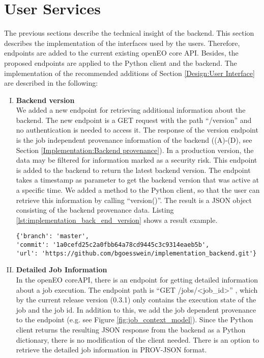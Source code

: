 \documentclass[draft,final]{vutinfth} %
\begin{document}
\section{User Services}\label{Implementation:User Interface}
The previous sections describe the technical insight of the backend. This section describes the implementation of the interfaces used by the users. Therefore, endpoints are added to the current existing openEO core API. Besides, the proposed endpoints are applied to the Python client and the backend. The implementation of the recommended additions of Section \ref{Design:User Interface} are described in the following:

\begin{enumerate}[I.]
\item \textbf{Backend version} \\
	We added a new endpoint for retrieving additional information about the backend. The new endpoint is a GET request with the path “/version” and no authentication is needed to access it. The response of the version endpoint is the job independent provenance information of the backend ((A)-(D), see Section \ref{Implementation:Backend provenance}). In a production version, the data may be filtered for information marked as a security risk. This endpoint is added to the backend to return the latest backend version. The endpoint takes a timestamp as parameter to get the backend version that was active at a specific time. We added a method to the Python client, so that the user can retrieve this information by calling “version()”. The result is a JSON object consisting of the backend provenance data. Listing \ref{lst:implementation_back_end_version} shows a result example.

\begin{listing}[ht]
	\begin{verbatim}
{'branch': 'master',
'commit': '1a0cefd25c2a0fbb64a78cd9445c3c9314eaeb5b',
'url': 'https://github.com/bgoesswein/implementation_backend.git'}
	\end{verbatim}
	\caption{Backend version example.}
	\label{lst:implementation_back_end_version}
\end{listing}

\item \textbf{Detailed Job Information} \\
	In the openEO coreAPI, there is an endpoint for getting detailed information about a job execution. The endpoint path is “GET /jobs/<job\_id>” , which by the current release version (0.3.1) only contains the execution state of the job and the job id. In addition to this, we add the job dependent provenance to the endpoint (e.g. see Figure \ref{fig:job_context_model}). Since the Python client returns the resulting JSON response from the backend as a Python dictionary, there is no modification of the client needed. {There is an option to retrieve the detailed job information in PROV-JSON format.}


\end{enumerate}
\end{document}
